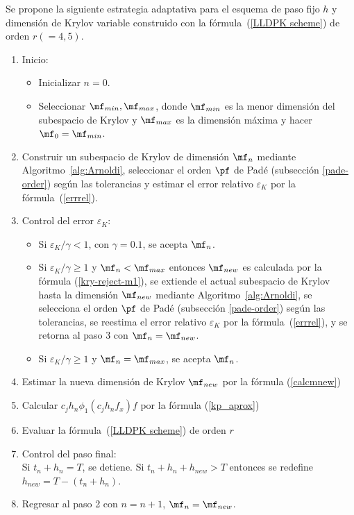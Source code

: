 Se propone la siguiente estrategia adaptativa para el esquema de paso fijo $h$ y dimensi\'on de Krylov variable construido con la f\'ormula~(\ref{LLDPK scheme}) de orden $r(=4,5)$. 

\begin{enumerate}
    \item Inicio:
    \begin{itemize}
        \item Inicializar $n=0$.
        \item Seleccionar $\mf_{min},\mf_{max}$, donde $\mf_{min}$ es la menor dimensión del subespacio de Krylov
        y $\mf_{max}$ es la dimensión máxima y hacer $\mf_0=\mf_{min}$.
    \end{itemize} 
    
    \item Construir un subespacio de Krylov de dimensión $\mf_n$ mediante Algoritmo~\ref{alg:Arnoldi},
    seleccionar el orden $\pf$ de Pad\'e (subsección \ref{pade-order}) según las tolerancias y estimar el error relativo $\varepsilon_{K}$ por la f\'ormula~(\ref{errrel}).
    
    \item Control del error $\varepsilon_{K}$:
    \begin{itemize}

            \item Si $\varepsilon_{K}/\gamma< 1$, con $\gamma=0\mathord{.}1$, se acepta $\mf_n$.
            \item Si $\varepsilon_{K}/\gamma\geq 1$ y $\mf_n<\mf_{max}$ entonces $\mf_{new}$ es calculada por la f\'ormula (\ref{kry-reject-m1}), se extiende
             el actual subespacio de Krylov hasta la dimensión $\mf_{new}$ mediante Algoritmo~\ref{alg:Arnoldi},
            se selecciona el orden $\pf$ de Pad\'e (subsección \ref{pade-order}) según las tolerancias, se reestima el error relativo $\varepsilon_{K}$ por la f\'ormula~(\ref{errrel}), y se retorna al paso 3 con $\mf_n=\mf_{new}$.
            \item Si $\varepsilon_{K}/\gamma\geq 1$ y $\mf_n=\mf_{max}$, se acepta $\mf_n$.
    \end{itemize}
    
    
    \item Estimar la  nueva dimensión de Krylov $\mf_{new}$ por la fórmula (\ref{calcmnew})
    
    \item Calcular $c_jh_n\phi_1(c_jh_nf_x)f$ por la f\'ormula (\ref{kp_aprox})
    
    \item Evaluar la f\'ormula~(\ref{LLDPK scheme}) de orden $r$
    
    \item Control del paso final:\\
    Si $t_n+h_n=T$, se detiene. Si $t_n+h_n+h_{new}>T$ entonces se redefine $h_{new}=T-(t_n+h_n)$.
    
    \item Regresar al paso 2 con $n=n+1$, $\mf_n = \mf_{new}$.
    
\end{enumerate}
